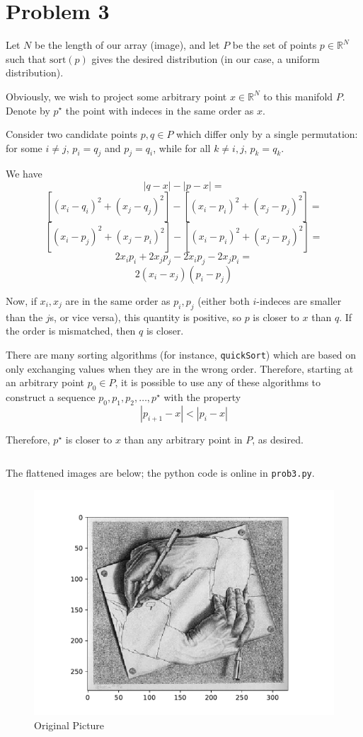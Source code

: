 \documentclass[psamsfonts]{amsart}
\theoremstyle{definition}
\theoremstyle{remark}
\numberwithin{equation}{section}
\begin{document}
\section{Problem 3}

Let $N$ be the length of our array (image), and let $P$ be the set of points $p \in \mathbb{R}^N$ such that 
$\text{sort}(p)$ gives the desired distribution (in our case, a uniform distribution).


Obviously, we wish to project some arbitrary point $x \in \mathbb{R}^N$ to this manifold $P$.
Denote by $p^{\star}$ the point with indeces in the same order as $x$.

Consider two candidate points $p, q \in P$ which differ only by a single permutation: 
for some $i \not= j$, $p_i = q_j$ and $p_j = q_i$, while for all $k \not= i, j$, $p_k = q_k$.

We have
\[
|q - x| - |p - x| = 
\]
\[
[(x_i - q_i)^2 + (x_j - q_j)^2] - [(x_i - p_i)^2 + (x_j - p_j)^2] = 
\]
\[
[(x_i - p_j)^2 + (x_j - p_i)^2] - [(x_i - p_i)^2 + (x_j - p_j)^2] = 
\]
\[
2x_ip_i + 2x_jp_j - 2x_ip_j - 2x_jp_i = 
\]
\[
2(x_i - x_j)(p_i - p_j)
\]

Now, if $x_i, x_j$ are in the same order as $p_i, p_j$ 
(either both $i$-indeces are smaller than the $j$s, or vice versa), 
this quantity is positive, so $p$ is closer to $x$ than $q$. If the order is mismatched, 
then $q$ is closer.

There are many sorting algorithms (for instance, \texttt{quickSort}) 
which are based on only exchanging values when they are in the wrong order. 
Therefore, starting at an arbitrary point $p_0 \in P$, it is possible 
to use any of these algorithms to construct a sequence $p_0, p_1, p_2, \ldots, p^{\star}$ with the property
\[
|p_{i + 1} - x| < |p_i - x|
\]

Therefore, $p^{\star}$ is closer to $x$ than any arbitrary point in $P$, as desired.

\[
\]

The flattened images are below; the python code is online in \texttt{prob3.py}.


\begin{figure}
\centering
\includegraphics[width=\textwidth]{../images/original.pdf}
\caption{Original Picture}
\label{fig3}
\end{figure}
\end{document}
